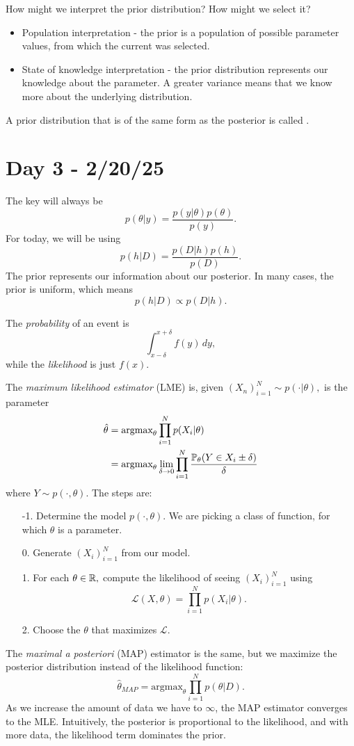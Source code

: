 \documentclass{chaistyle}
\begin{document}
\begin{enumerate}[1.]
\begin{example*}
        How might we interpret the prior distribution? How might we select it? 
        \begin{itemize}[-]
            \item Population interpretation - the prior is a population of possible parameter values, from which the current was selected.
            \item State of knowledge interpretation - the prior distribution represents our knowledge about the parameter. A greater variance means that we know more about the underlying distribution.
        \end{itemize}
        A prior distribution that is of the same form as the posterior is called .
    \end{example*}
\end{enumerate}
\section*{Day 3 - 2/20/25}
The key will always be \[p(\theta|y)=\frac{p(y|\theta)p(\theta)}{p(y)}.\] For today, we will be using \[p(h|D)=\frac{p(D|h)p(h)}{p(D)}.\] The prior represents our information about our posterior. In many cases, the prior is uniform, which means \[p(h|D)\propto p(D|h).\] 

The \textit{probability} of an event is \[\int_{x-\delta}^{x+\delta}f(y)\,dy,\] while the \textit{likelihood} is just \(f(x).\)

The \textit{maximum likelihood estimator} (LME) is, given \((X_n)_{i=1}^N\sim p(\cdot|\theta),\) is the parameter \begin{align*}
    \hat\theta&=\text{argmax}_\theta\prod_{i=1}^Np(X_i|\theta) \\ 
    &= \text{argmax}_\theta \lim_{\delta \to 0} \prod_{i=1}^N \frac{\P_\theta(Y\in X_i\pm\delta)}{\delta}
\end{align*}
where \(Y\sim p(\cdot,\theta).\)
The steps are: \begin{enumerate}
    \item[-1.] Determine the model \(p(\cdot,\theta).\) We are picking a class of function, for which \(\theta\) is a parameter.
    \item[0.] Generate \((X_i)_{i=1}^N\) from our model.
    \item[1.] For each \(\theta\in\R,\) compute the likelihood of seeing \((X_i)_{i=1}^N\) using \[\mathcal{L}(X,\theta)=\prod_{i=1}^N p(X_i|\theta).\]
    \item[2.] Choose the \(\theta\) that maximizes \(\mathcal{L}.\)
\end{enumerate}
The \textit{maximal a posteriori} (MAP) estimator is the same, but we maximize the posterior distribution instead of the likelihood function: \[\hat\theta_{MAP}=\text{argmax}_\theta \prod_{i=1}^N p(\theta|D).\]
As we increase the amount of data we have to \(\infty\), the MAP estimator converges to the MLE. Intuitively, the posterior is proportional to the likelihood, and with more data, the likelihood term dominates the prior.
\end{document}
